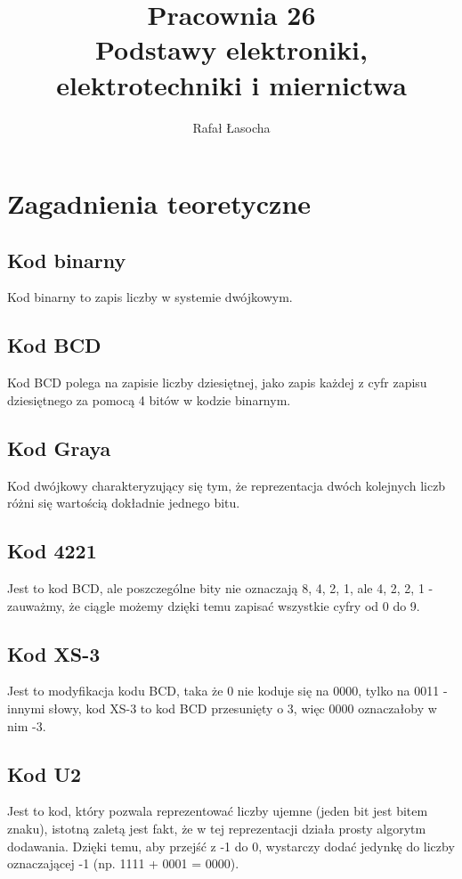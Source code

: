 \documentclass[a4paper,11pt]{article}
\title{
  \textbf{Pracownia 26}\\
  {\Large Podstawy elektroniki, elektrotechniki i miernictwa}
}
\author{Rafał Łasocha}
\begin{document}
\maketitle

\section{Zagadnienia teoretyczne}

\subsection{Kod binarny}
Kod binarny to zapis liczby w systemie dwójkowym.

\subsection{Kod BCD}
Kod BCD polega na zapisie liczby dziesiętnej, jako zapis każdej z cyfr zapisu dziesiętnego za pomocą 4 bitów w kodzie binarnym.

\subsection{Kod Graya}
Kod dwójkowy charakteryzujący się tym, że reprezentacja dwóch kolejnych liczb różni się wartością dokładnie jednego bitu.

\subsection{Kod 4221}
Jest to kod BCD, ale poszczególne bity nie oznaczają 8, 4, 2, 1, ale 4, 2, 2, 1 - zauważmy, że ciągle możemy dzięki temu zapisać wszystkie cyfry od 0 do 9.

\subsection{Kod XS-3}
Jest to modyfikacja kodu BCD, taka że 0 nie koduje się na 0000, tylko na 0011 - innymi słowy, kod XS-3 to kod BCD przesunięty o 3, więc 0000 oznaczałoby w nim -3.

\subsection{Kod U2}
Jest to kod, który pozwala reprezentować liczby ujemne (jeden bit jest bitem znaku), istotną zaletą jest fakt, że w tej reprezentacji działa prosty algorytm dodawania. Dzięki temu, aby przejść z -1 do 0, wystarczy dodać jedynkę do liczby oznaczającej -1 (np. 1111 + 0001 = 0000).
\end{document}
